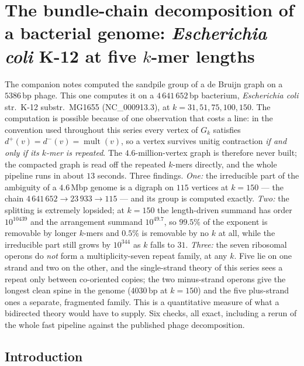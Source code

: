 \chapter{The bundle-chain decomposition of a bacterial genome: \emph{Escherichia coli} K-12 at five $k$-mer lengths}\label{chap:Bio5}
\begin{chapterabstract}
\noindent
The companion notes computed the sandpile group of a de Bruijn graph on a $5386$\,bp
phage. This one computes it on a $4\,641\,652$\,bp bacterium, \emph{Escherichia coli}
str.\ K-12 substr.\ MG1655 (NC\_000913.3), at $k=31,51,75,100,150$. The computation is
possible because of one observation that costs a line: in the convention used throughout
this series every vertex of $G_k$ satisfies $d^{+}(v)=d^{-}(v)=\operatorname{mult}(v)$, so
a vertex survives unitig contraction \emph{if and only if its $k$-mer is repeated}. The
$4.6$-million-vertex graph is therefore never built; the compacted graph is read off the
repeated $k$-mers directly, and the whole pipeline runs in about $13$ seconds. Three
findings. \emph{One:} the irreducible part of the ambiguity of a $4.6$\,Mbp genome is a
digraph on $115$ vertices at $k=150$ --- the chain $4\,641\,652\to23\,933\to115$ --- and
its group is computed exactly. \emph{Two:} the splitting is extremely lopsided; at
$k=150$ the length-driven summand has order $10^{10439}$ and the arrangement summand
$10^{49.7}$, so $99.5\%$ of the exponent is removable by longer $k$-mers and $0.5\%$ is
removable by no $k$ at all, while the irreducible part still grows by $10^{344}$ as $k$
falls to $31$. \emph{Three:} the seven ribosomal operons do \emph{not} form a
multiplicity-seven repeat family, at any $k$. Five lie on one strand and two on the
other, and the single-strand theory of this series sees a repeat only between co-oriented
copies; the two minus-strand operons give the longest clean spine in the genome
($4030$\,bp at $k=150$) and the five plus-strand ones a separate, fragmented family. This
is a quantitative measure of what a bidirected theory would have to supply. Six checks,
all exact, including a rerun of the whole fast pipeline against the published phage
decomposition.
\end{chapterabstract}

\section{Introduction}\label{Bio5:sec:intro}

